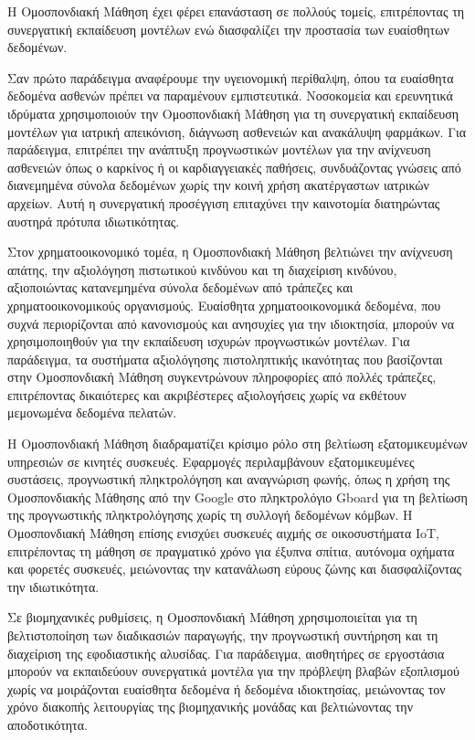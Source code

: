 Η Ομοσπονδιακή Μάθηση έχει φέρει επανάσταση σε πολλούς τομείς, επιτρέποντας τη συνεργατική εκπαίδευση μοντέλων ενώ διασφαλίζει την προστασία των ευαίσθητων δεδομένων.

Σαν πρώτο παράδειγμα αναφέρουμε την υγειονομική περίθαλψη, όπου τα ευαίσθητα δεδομένα ασθενών πρέπει να παραμένουν εμπιστευτικά. Νοσοκομεία και ερευνητικά ιδρύματα χρησιμοποιούν την Ομοσπονδιακή Μάθηση για τη συνεργατική εκπαίδευση μοντέλων για ιατρική απεικόνιση, διάγνωση ασθενειών και ανακάλυψη φαρμάκων. Για παράδειγμα, επιτρέπει την ανάπτυξη προγνωστικών μοντέλων για την ανίχνευση ασθενειών όπως ο καρκίνος ή οι καρδιαγγειακές παθήσεις, συνδυάζοντας γνώσεις από διανεμημένα σύνολα δεδομένων χωρίς την κοινή χρήση ακατέργαστων ιατρικών αρχείων. Αυτή η συνεργατική προσέγγιση επιταχύνει την καινοτομία διατηρώντας αυστηρά πρότυπα ιδιωτικότητας.

Στον χρηματοοικονομικό τομέα, η Ομοσπονδιακή Μάθηση βελτιώνει την ανίχνευση απάτης, την αξιολόγηση πιστωτικού κινδύνου και τη διαχείριση κινδύνου, αξιοποιώντας κατανεμημένα σύνολα δεδομένων από τράπεζες και χρηματοοικονομικούς οργανισμούς. Ευαίσθητα χρηματοοικονομικά δεδομένα, που συχνά περιορίζονται από κανονισμούς και ανησυχίες για την ιδιοκτησία, μπορούν να χρησιμοποιηθούν για την εκπαίδευση ισχυρών προγνωστικών μοντέλων. Για παράδειγμα, τα συστήματα αξιολόγησης πιστοληπτικής ικανότητας που βασίζονται στην Ομοσπονδιακή Μάθηση συγκεντρώνουν πληροφορίες από πολλές τράπεζες, επιτρέποντας δικαιότερες και ακριβέστερες αξιολογήσεις χωρίς να εκθέτουν μεμονωμένα δεδομένα πελατών.

Η Ομοσπονδιακή Μάθηση διαδραματίζει κρίσιμο ρόλο στη βελτίωση εξατομικευμένων υπηρεσιών σε κινητές συσκευές. Εφαρμογές περιλαμβάνουν εξατομικευμένες συστάσεις, προγνωστική πληκτρολόγηση και αναγνώριση φωνής, όπως η χρήση της Ομοσπονδιακής Μάθησης από την Google στο πληκτρολόγιο Gboard για τη βελτίωση της προγνωστικής πληκτρολόγησης χωρίς τη συλλογή δεδομένων κόμβων. Η Ομοσπονδιακή Μάθηση επίσης ενισχύει συσκευές αιχμής σε οικοσυστήματα IoT, επιτρέποντας τη μάθηση σε πραγματικό χρόνο για έξυπνα σπίτια, αυτόνομα οχήματα και φορετές συσκευές, μειώνοντας την κατανάλωση εύρους ζώνης και διασφαλίζοντας την ιδιωτικότητα.

Σε βιομηχανικές ρυθμίσεις, η Ομοσπονδιακή Μάθηση χρησιμοποιείται για τη βελτιστοποίηση των διαδικασιών παραγωγής, την προγνωστική συντήρηση και τη διαχείριση της εφοδιαστικής αλυσίδας. Για παράδειγμα, αισθητήρες σε εργοστάσια μπορούν να εκπαιδεύουν συνεργατικά μοντέλα για την πρόβλεψη βλαβών εξοπλισμού χωρίς να μοιράζονται ευαίσθητα δεδομένα ή δεδομένα ιδιοκτησίας, μειώνοντας τον χρόνο διακοπής λειτουργίας της βιομηχανικής μονάδας και βελτιώνοντας την αποδοτικότητα.

